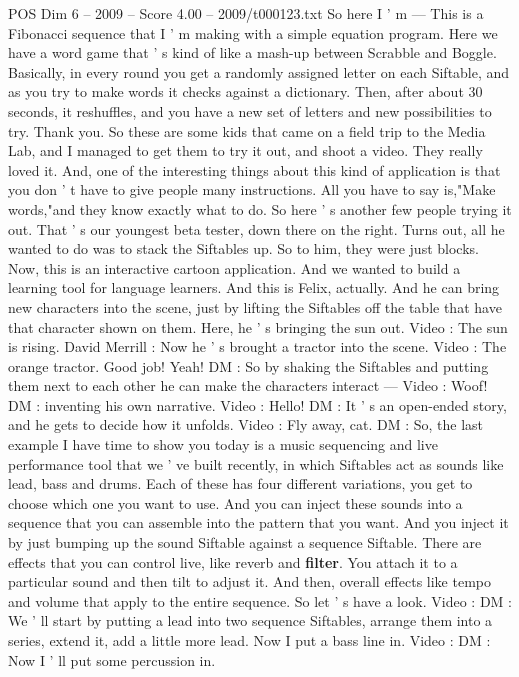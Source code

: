 \begin{textsample}{POS Dim 6 – 2009 – Score 4.00 – 2009/t000123.txt}
So here I ' m — This is a Fibonacci sequence that I ' m making with a simple equation program.
Here we have a word game that ' s kind of like a mash-up between Scrabble and Boggle.
Basically, in every round you get a randomly assigned letter on each Siftable, and as you try to make words it checks against a dictionary.
Then, after about 30 seconds, it reshuffles, and you have a new set of letters and new possibilities to try.
Thank you.
So these are some kids that came on a field trip to the Media Lab, and I managed to get them to try it out, and shoot a video.
They really loved it.
And, one of the interesting things about this kind of application is that you don ' t have to give people many instructions.
All you have to say is,"Make words,"and they know exactly what to do.
So here ' s another few people trying it out.
That ' s our youngest beta tester, down there on the right.
Turns out, all he wanted to do was to stack the Siftables up.
So to him, they were just blocks.
Now, this is an interactive cartoon application.
And we wanted to build a learning tool for language learners.
And this is Felix, actually.
And he can bring new characters into the scene, just by lifting the Siftables off the table that have that character shown on them.
Here, he ' s bringing the sun out.
Video : The sun is rising.
David Merrill : Now he ' s brought a tractor into the scene.
Video : The orange tractor.
Good job!
Yeah!
DM : So by shaking the Siftables and putting them next to each other he can make the characters interact — Video : Woof!
DM : inventing his own narrative.
Video : Hello!
DM : It ' s an open-ended story, and he gets to decide how it unfolds.
Video : Fly away, cat.
DM : So, the last example I have time to show you today is a music sequencing and live performance tool that we ' ve built recently, in which Siftables act as sounds like lead, bass and drums.
Each of these has four different variations, you get to choose which one you want to use.
And you can inject these sounds into a sequence that you can assemble into the pattern that you want.
And you inject it by just bumping up the sound Siftable against a sequence Siftable.
There are effects that you can control live, like reverb and \textbf{filter}.
You attach it to a particular sound and then tilt to adjust it.
And then, overall effects like tempo and volume that apply to the entire sequence.
So let ' s have a look.
Video : DM : We ' ll start by putting a lead into two sequence Siftables, arrange them into a series, extend it, add a little more lead.
Now I put a bass line in.
Video : DM : Now I ' ll put some percussion in.

\end{textsample}
